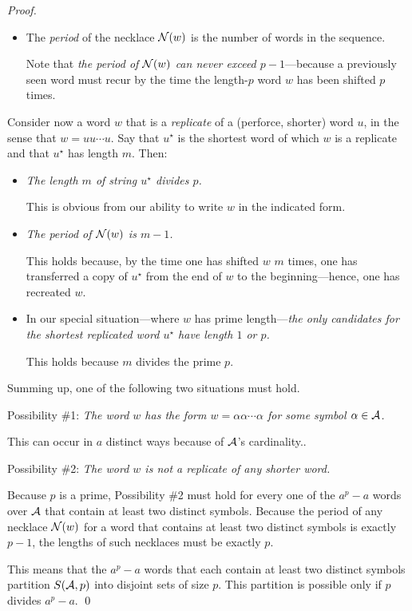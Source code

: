 \begin{proof}
\begin{itemize}
\medskip\item
The {\it period} of the necklace $\mbox{$\cal N$}(w)$ is the number of words in the sequence.

\smallskip

Note that {\em the period of $\mbox{$\cal N$}(w)$ can never exceed $p-1$}---because a previously seen word must recur by the time the length-$p$ word $w$ has been shifted $p$ times.
\end{itemize}

Consider now a word $w$ that is a {\it replicate} of a (perforce, shorter) word $u$, in the sense that $w = uu \cdots u$.  Say that $u^\star$ is the shortest word of which $w$ is a replicate and that $u^\star$ has length $m$.  Then:
\begin{itemize}
\item
{\em The length $m$ of string $u^\star$ divides $p$.}

\smallskip

This is obvious from our ability to write $w$ in the indicated form.

\medskip\item
{\em The period of $\mbox{$\cal N$}(w)$ is $m-1$.}

\smallskip

This holds because, by the time one has shifted $w$ $m$ times, one has transferred a copy of $u^\star$ from the end of $w$ to the beginning---hence, one has recreated $w$.

\medskip\item
In our special situation---where $w$ has prime length---{\em the only candidates for the shortest replicated word $u^\star$ have length $1$ or $p$.}

\smallskip

This holds because $m$ divides the prime $p$.
\end{itemize}
Summing up, one of the following two situations must hold.

\medskip

\noindent
Possibility \#1:
{\em The word $w$ has the form $w = \alpha \alpha \cdots \alpha$ for some symbol $\alpha \in \mbox{$\cal A$}$.}

This can occur in $a$ distinct ways because of $\mbox{$\cal A$}$'s cardinality..

\medskip

\noindent
Possibility \#2:
{\em The word $w$ is not a replicate of any shorter word.}

\smallskip

Because $p$ is a prime, Possibility \#2 must hold for every one of the $a^p - a$ words over $\mbox{$\cal A$}$ that contain at least two distinct symbols.  Because the period of any necklace $\mbox{$\cal N$}(w)$ for a word that contains at least two distinct symbols is exactly $p-1$, the lengths of such necklaces must be exactly $p$.

This means that the $a^p - a$ words that each contain at least two distinct symbols partition $S(\mbox{$\cal A$}, p)$ into disjoint sets of size $p$.  This partition is possible only if $p$ divides $a^p - a$.  \qed
\end{proof}

